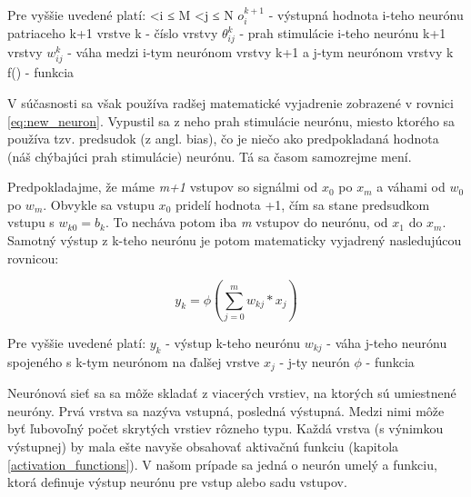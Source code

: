 	Pre vyššie uvedené platí: 
	 \textless i ≤ M
	 \textless j ≤ N
	\newline
	\(o_i^{k+1}\)  - výstupná hodnota i-teho neurónu patriaceho k+1 vrstve 
	\newline
	k - číslo vrstvy
	\newline
	\(\theta_{ij}^{k}\) - prah stimulácie i-teho neurónu k+1 vrstvy
	\newline
	\(w_{ij}^{k}\) - váha medzi i-tym neurónom vrstvy k+1 a j-tym neurónom vrstvy k 
	\newline 
	f() - funkcia
	\newline
	
	V súčasnosti sa však používa radšej matematické vyjadrenie zobrazené v rovnici \ref{eq:new_neuron}. Vypustil sa z neho prah stimulácie neurónu, miesto ktorého sa používa tzv. predsudok (z angl. bias), čo je niečo ako predpokladaná hodnota (náš chýbajúci prah stimulácie) neurónu. Tá sa časom samozrejme mení. 
	
	Predpokladajme, že máme \textit{m+1} vstupov so signálmi od \(x_0\) po \(x_m\) a váhami od \(w_0\) po \(w_m\). Obvykle sa vstupu \(x_0\) pridelí hodnota +1, čím sa stane predsudkom vstupu s \(w_{k0} = b_k\). To necháva potom iba \textit{m} vstupov do neurónu, od \(x_1\) do \(x_m\). Samotný výstup z k-teho neurónu je potom matematicky vyjadrený nasledujúcou rovnicou:
	
	\begin{equation}
		\label{eq:new_neuron}
		y_k = \phi (\sum_{j=0}^{m} w_{kj}*x_j)
	\end{equation}
	
	Pre vyššie uvedené platí:
	\newline
	\(y_k\) - výstup k-teho neurónu
	\newline
	\(w_{kj}\) - váha j-teho neurónu spojeného s k-tym neurónom na ďalšej vrstve
	\newline
	\(x_j\) - j-ty neurón 
	\newline
	\(\phi\) - funkcia
	\newline
	
Neurónová sieť sa sa môže skladať z viacerých vrstiev, na ktorých sú umiestnené neuróny. Prvá vrstva sa nazýva vstupná, posledná výstupná. Medzi nimi môže byť ľubovoľný počet skrytých vrstiev rôzneho typu. Každá vrstva (s výnimkou výstupnej) by mala ešte navyše obsahovať aktivačnú funkciu (kapitola \ref{activation_functions}). V našom prípade sa jedná o neurón umelý a funkciu, ktorá definuje výstup neurónu pre vstup alebo sadu vstupov.
	
